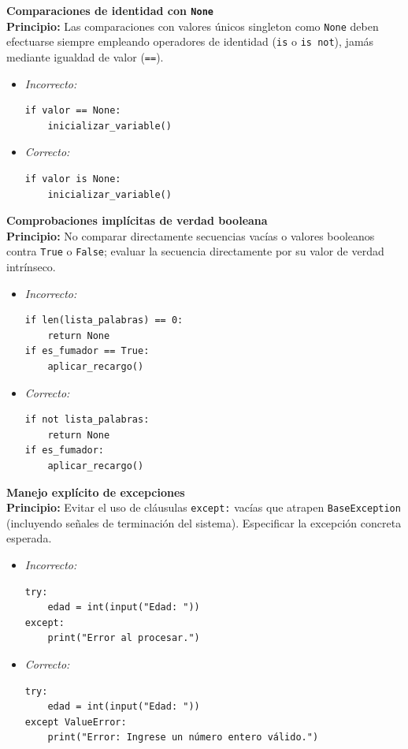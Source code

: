 \documentclass{article}
\begin{document}
    \item \textbf{Comparaciones de identidad con \texttt{None}} \\
    \textbf{Principio:} Las comparaciones con valores únicos singleton como \texttt{None} deben efectuarse siempre empleando operadores de identidad (\texttt{is} o \texttt{is not}), jamás mediante igualdad de valor (\texttt{==}).
    \begin{itemize}
        \item \textit{Incorrecto:}
\begin{verbatim}
if valor == None:
    inicializar_variable()
\end{verbatim}
        \item \textit{Correcto:}
\begin{verbatim}
if valor is None:
    inicializar_variable()
\end{verbatim}
    \end{itemize}

    \item \textbf{Comprobaciones implícitas de verdad booleana} \\
    \textbf{Principio:} No comparar directamente secuencias vacías o valores booleanos contra \texttt{True} o \texttt{False}; evaluar la secuencia directamente por su valor de verdad intrínseco.
    \begin{itemize}
        \item \textit{Incorrecto:}
\begin{verbatim}
if len(lista_palabras) == 0:
    return None
if es_fumador == True:
    aplicar_recargo()
\end{verbatim}
        \item \textit{Correcto:}
\begin{verbatim}
if not lista_palabras:
    return None
if es_fumador:
    aplicar_recargo()
\end{verbatim}
    \end{itemize}

    \item \textbf{Manejo explícito de excepciones} \\
    \textbf{Principio:} Evitar el uso de cláusulas \texttt{except:} vacías que atrapen \texttt{BaseException} (incluyendo señales de terminación del sistema). Especificar la excepción concreta esperada.
    \begin{itemize}
        \item \textit{Incorrecto:}
\begin{verbatim}
try:
    edad = int(input("Edad: "))
except:
    print("Error al procesar.")
\end{verbatim}
        \item \textit{Correcto:}
\begin{verbatim}
try:
    edad = int(input("Edad: "))
except ValueError:
    print("Error: Ingrese un número entero válido.")
\end{verbatim}
    \end{itemize}
\end{document}
